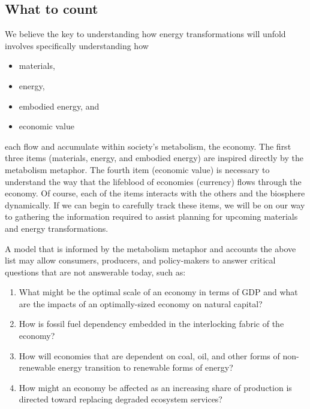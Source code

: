 \subsection{What to count}
\label{sec:what_to_count}

We believe the key to understanding how energy transformations will unfold
involves specifically understanding how

\begin{itemize}
	\item{materials,}
	\item{energy,}
	\item{embodied energy, and}
	\item{economic value}
\end{itemize}

\noindent{}each flow and accumulate within society's metabolism, the economy.
The first three items (materials, energy, and embodied energy) are
inspired directly by the metabolism metaphor.
The fourth item (economic value) is necessary to understand the way 
that the lifeblood of economies (currency) flows through the economy.
Of course, each of the items interacts with the others 
and the biosphere dynamically.
If we can begin to carefully track these items, 
we will be on our way to gathering the information required to 
assist planning for upcoming materials and energy transformations.

A model that is informed by the metabolism metaphor and accounts the above list
may allow consumers, producers,
and policy-makers to answer critical questions that are not
answerable today, such as:

\begin{enumerate}
	\item{What might be the optimal scale of an economy in terms of GDP 
			and what are the impacts of an optimally-sized economy on natural capital?}
    \item{How is fossil fuel dependency embedded in the interlocking fabric of the economy?} 
    \item{How will economies that are dependent on coal, oil, 
 			and other forms of non-renewable energy transition 
			to renewable forms of energy?}
	\item{How might an economy be affected as an increasing share of production
			is directed toward replacing 
			degraded ecosystem services?~\cite[p.~221]{kummel2011}​}
\end{enumerate}

